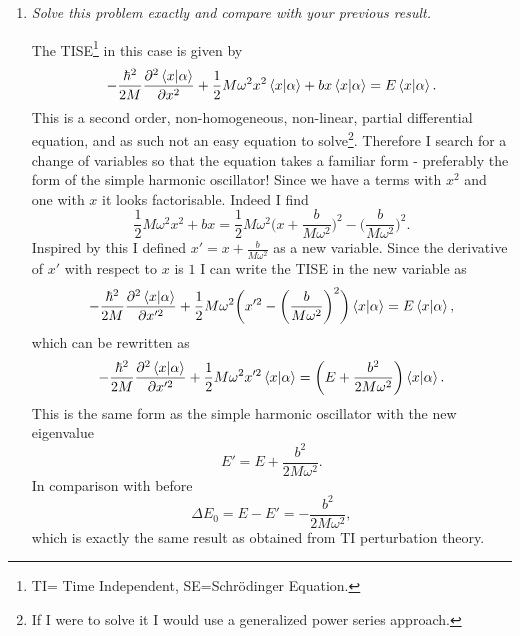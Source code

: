 \begin{example}
\begin{enumerate}
		\item \emph{Solve this problem exactly and compare with your previous result.}\newline
		
		The TISE\footnote{TI= Time Independent, SE=Schrödinger Equation.} in this case is given by
		\begin{equation}
			-\frac{\hbar^2}{2M}\frac{\partial^2 \braket{x|\alpha}}{\partial x^2}+\frac{1}{2}M\omega^2x^2\braket{x|\alpha}+bx\braket{x|\alpha}=E\braket{x|\alpha}.
		\end{equation} 
		This is a second order, non-homogeneous, non-linear, partial differential equation, and as such not an easy equation to solve\footnote{If I were to solve it I would use a generalized power series approach.}. Therefore I search for a change of variables so that the equation takes a familiar form - preferably the form of the simple harmonic oscillator! Since we have a terms with $x^2$ and one with $x$ it looks factorisable. Indeed I find 
		\begin{equation}
			\frac{1}{2}M\omega^2x^2+bx=\frac{1}{2}M\omega^2\bigg(x+\frac{b}{M\omega^2}\bigg)^2-\bigg(\frac{b}{M\omega^2}\bigg)^2.
		\end{equation} 
		Inspired by this I defined $x'=x+\frac{b}{M\omega^2}$ as a new variable. Since the derivative of $x'$ with respect to $x$ is $1$ I can write the TISE in the new variable as
		\begin{equation}
			-\frac{\hbar^2}{2M}\frac{\partial^2 \braket{x|\alpha}}{\partial x'^2}+\frac{1}{2}M\omega^2\bigg(x'^2-\bigg(\frac{b}{M\omega^2}\bigg)^2\bigg)\braket{x|\alpha}=E\braket{x|\alpha},
		\end{equation} 
		which can be rewritten as
		\begin{equation}
			-\frac{\hbar^2}{2M}\frac{\partial^2 \braket{x|\alpha}}{\partial x'^2}+\frac{1}{2}M\omega^2x'^2\braket{x|\alpha}=\bigg(E+\frac{b^2}{2M\omega^2}\bigg)\braket{x|\alpha}.
		\end{equation} 
		This is the same form as the simple harmonic oscillator with the new eigenvalue
		\begin{equation}
			E'=E+\frac{b^2}{2M\omega^2}.
		\end{equation} 
		In comparison with before
		\begin{equation}
			\Delta E_0=E-E'=-\frac{b^2}{2M\omega^2},
		\end{equation} 
		which is exactly the same result as obtained from TI perturbation theory.	
	\end{enumerate}
\end{example}


